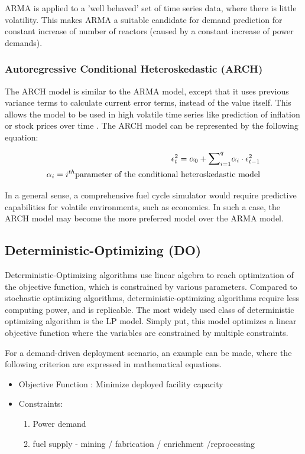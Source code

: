 \gls{ARMA} is applied to a 'well behaved' set of time series data,
where there is little volatility. This makes \gls{ARMA} a suitable
candidate for demand prediction for constant increase of number of
reactors (caused by a constant increase of power demands).


\subsubsection{Autoregressive Conditional Heteroskedastic (ARCH)}
The \gls{ARCH} model is similar to the \gls{ARMA} model, except that
it uses previous variance terms to calculate current error terms, instead
of the value itself. This allows the model to be used in high volatile 
time series like prediction of inflation or stock prices over time \cite{bollerselv_1986}.
The \gls{ARCH} model can be represented by the following equation:

\begin{align}
	\epsilon_t^2 = \alpha_0+{\mathlarger{\sum}}_{i=1}^{q}\alpha_i\cdot\epsilon_{t-1}^2\\
	\alpha_i= i^{th} \mbox{parameter of the conditional heteroskedastic model}
\end{align}


In a general sense, a comprehensive fuel cycle simulator would require
predictive capabilities for volatile environments, such as economics.
In such a case, the \gls{ARCH} model may become the more preferred model
over the \gls{ARMA} model.



\subsection{Deterministic-Optimizing (DO)}
Deterministic-Optimizing algorithms use linear algebra to
reach optimization of the objective function, which is
constrained by various parameters. Compared to stochastic
optimizing algorithms, deterministic-optimizing algorithms
require less computing power, and is replicable. The most
widely used class of deterministic optimizing algorithm
is the \gls{LP} model. Simply put, this model optimizes a
linear objective function where the variables are constrained
by multiple constraints.

For a demand-driven deployment scenario, an example can be made,
where the following criterion are expressed in mathematical equations.

\begin{itemize}
	\item[] Objective Function : Minimize deployed facility capacity
	\item[] Constraints:
	\begin{enumerate}
		\item Power demand
		\item fuel supply - mining / fabrication / enrichment /reprocessing
	\end{enumerate}
		
\end{itemize}




